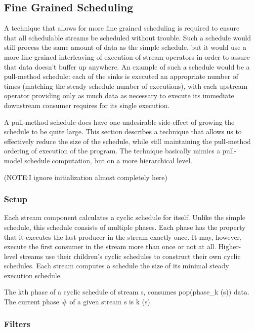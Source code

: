 \subsection{Fine Grained Scheduling}

A technique that allows for more fine grained scheduling is required to
ensure that all schedulable streams be scheduled without trouble.  Such a
schedule would still process the same amount of data as the simple schedule,
but it would use a more fine-grained interleaving of execution of stream
operators in order to assure that data doesn't buffer up anywhere.
An example of such a schedule would be a pull-method schedule: each of the
sinks is executed an appropriate number of times (matching the steady schedule
number of executions), with each upstream operator providing only as much 
data as necessary to execute its immediate downstream consumer requires 
for its single execution.

A pull-method schedule does have one undesirable side-effect of growing the
schedule to be quite large.  This section describes a technique that allows
us to effectively reduce the size of the schedule, while still maintaining
the pull-method ordering of execution of the program.  The technique 
basically mimics a pull-model schedule computation, but on a more
hierarchical level.

(NOTE:I ignore initialization almost completely here)

\subsubsection{Setup}

Each stream component calculates a cyclic schedule for itself.  Unlike the
simple schedule, this schedule consists of multiple phases.  Each phase has
the property that it executes the last producer in the stream exactly once.
It may, however, execute the first consumer in the stream more than once
or not at all.  Higher-level streams use their children's cyclic schedules 
to construct their own cyclic schedules.  Each stream computes a schedule 
the size of its minimal steady execution schedule.

The kth phase of a cyclic schedule of stream s, consumes pop(phase_k (s))
data.  The current phase # of a given stream s is k (s).

\subsubsection{Filters}


